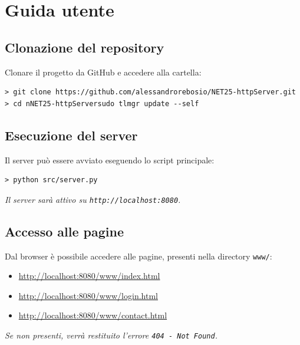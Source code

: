 \documentclass[a4paper,12pt]{report}
\begin{document}
\appendix
\chapter{Guida utente}
\section{Clonazione del repository}
Clonare il progetto da GitHub e accedere alla cartella:

{\footnotesize
\begin{verbatim}
> git clone https://github.com/alessandrorebosio/NET25-httpServer.git
> cd nNET25-httpServersudo tlmgr update --self
\end{verbatim}
}

\section{Esecuzione del server}
Il server può essere avviato eseguendo lo script principale:

{\footnotesize
\begin{verbatim}
> python src/server.py
\end{verbatim}
}
\noindent \textit{Il server sarà attivo su \texttt{http://localhost:8080}.}

\section{Accesso alle pagine}
Dal browser è possibile accedere alle pagine, presenti nella directory \texttt{www/}:

{\footnotesize
\begin{itemize}
	\item \url{http://localhost:8080/www/index.html}
	\item \url{http://localhost:8080/www/login.html}
	\item \url{http://localhost:8080/www/contact.html}
\end{itemize}
}

\noindent \textit{Se non presenti, verrà restituito l'errore \texttt{404 - Not Found}.}
\end{document}
